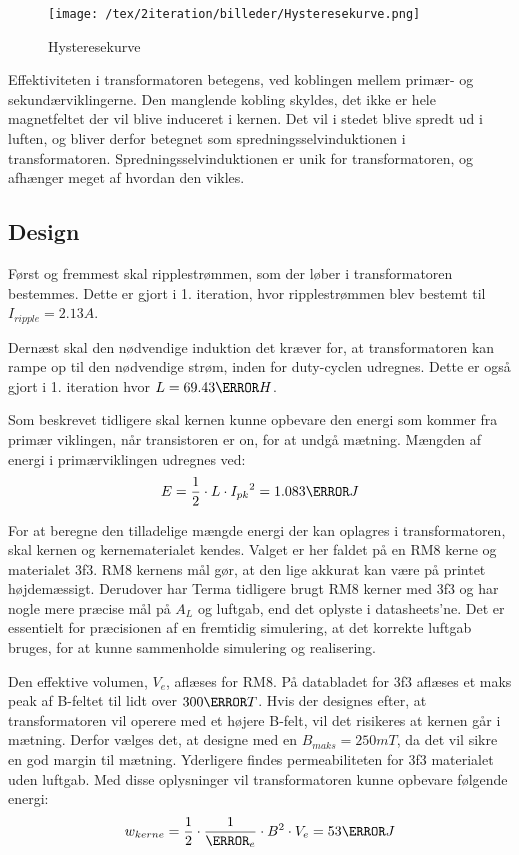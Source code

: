 \begin{figure}[H]
	\center
	\texttt{[image: /tex/2iteration/billeder/Hysteresekurve.png]}
	\caption{Hysteresekurve}
	\label{fig: Hysteresekurve}
\end{figure}


Effektiviteten i transformatoren betegens, ved koblingen mellem primær- og sekundærviklingerne. Den manglende kobling skyldes, det ikke er hele magnetfeltet der vil blive induceret i kernen. Det vil i stedet blive spredt ud i luften, og bliver derfor betegnet som spredningsselvinduktionen i transformatoren. Spredningsselvinduktionen er unik for transformatoren, og afhænger meget af hvordan den vikles. 


\subsection{Design}
Først og fremmest skal ripplestrømmen, som der løber i transformatoren bestemmes. Dette er gjort i 1. iteration, hvor ripplestrømmen blev bestemt til $I_{ripple} = 2.13A$.

Dernæst skal den nødvendige induktion det kræver for, at transformatoren kan rampe op til den nødvendige strøm, inden for duty-cyclen udregnes. Dette er også gjort i 1. iteration hvor $L=69.43\micro H$.

Som beskrevet tidligere skal kernen kunne opbevare den energi som kommer fra primær viklingen, når transistoren er on, for at undgå mætning. Mængden af energi i primærviklingen udregnes ved:
\begin{equation} \label{Primary_energy}
E = \frac{1} {2} \cdot L \cdot {I_{pk}}^2 = 1.083\milli J
\end{equation}

For at beregne den tilladelige mængde energi der kan oplagres i transformatoren, skal kernen og kernematerialet kendes. Valget er her faldet på en RM8 kerne\cite{RM8} og materialet 3f3\cite{3f3}. RM8 kernens mål gør, at den lige akkurat kan være på printet højdemæssigt. Derudover har Terma tidligere brugt RM8 kerner med 3f3 og har nogle mere præcise mål på $A_L$ og luftgab, end det oplyste i datasheets’ne. Det er essentielt for præcisionen af en fremtidig simulering, at det korrekte luftgab bruges, for at kunne sammenholde simulering og realisering.


Den effektive volumen, $V_e$, aflæses for RM8. På databladet for 3f3 aflæses et maks peak af B-feltet til lidt over $300\milli T$. Hvis der designes efter, at transformatoren vil operere med et højere B-felt, vil det risikeres at kernen går i mætning. Derfor vælges det, at designe med en $B_{maks}=250mT$, da det vil sikre en god margin til mætning. Yderligere findes permeabiliteten for 3f3 materialet uden luftgab. Med disse oplysninger vil transformatoren kunne opbevare følgende energi:
\begin{equation} \label{Energy_no_gap}
w_{kerne} = \frac{1} {2} \cdot \frac{1}{\micro_e} \cdot B^2 \cdot V_e = 53\pico J
\end{equation}

